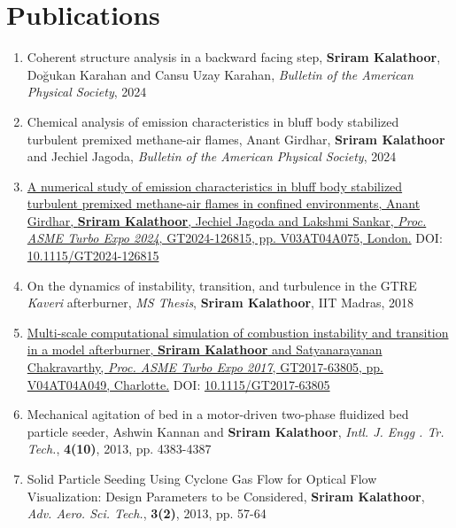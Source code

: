 \documentclass[letterpaper,11pt]{article}
\begin{document}
\section{Publications}
\vspace{9pt}
\begin{enumerate}
    \item {Coherent structure analysis in a backward facing step}, \textbf{Sriram Kalathoor}, Do\u{g}ukan Karahan and Cansu Uzay Karahan, \emph{Bulletin of the American Physical Society}, 2024
    \item {Chemical analysis of emission characteristics in bluff body stabilized turbulent premixed methane-air flames}, Anant Girdhar, \textbf{Sriram Kalathoor} and Jechiel Jagoda, \emph{Bulletin of the American Physical Society}, 2024
    \item \href{https://doi.org/10.1115/GT2024-126815}{A numerical study of emission characteristics in bluff body stabilized turbulent premixed methane-air flames in confined environments, Anant Girdhar, \textbf{Sriram Kalathoor}, Jechiel Jagoda and Lakshmi Sankar, \emph{Proc. ASME Turbo Expo 2024}, GT2024-126815, pp. V03AT04A075, London.} DOI: \href{https://doi.org/10.1115/GT2024-126815}{10.1115/GT2024-126815}
    \item {On the dynamics of instability, transition, and turbulence in the GTRE \emph{Kaveri} afterburner}, \emph{MS Thesis}, \textbf{Sriram Kalathoor}, IIT Madras, 2018\clearpage
    \vspace*{3pt}
    \item \href{https://doi.org/10.1115/GT2017-63805}{Multi-scale computational simulation of combustion instability and transition in a model afterburner, \textbf{Sriram Kalathoor} and Satyanarayanan Chakravarthy, \emph{Proc. ASME Turbo Expo 2017}, GT2017-63805, pp. V04AT04A049, Charlotte.} DOI: \href{https://doi.org/10.1115/GT2017-63805}{10.1115/GT2017-63805}
    \item {Mechanical agitation of bed in a motor-driven two-phase fluidized bed particle seeder}, Ashwin Kannan and \textbf{Sriram Kalathoor}, \emph{Intl. J. Engg . Tr. Tech.}, \textbf{4(10)}, 2013, pp. 4383-4387
    \item {Solid Particle Seeding Using Cyclone Gas Flow for Optical Flow Visualization: Design Parameters to be Considered}, \textbf{Sriram Kalathoor}, \emph{Adv. Aero. Sci. Tech.}, \textbf{3(2)}, 2013, pp. 57-64
\end{enumerate}
\end{document}
